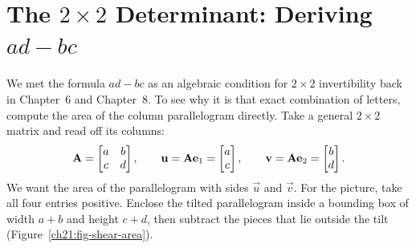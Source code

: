 \section{The $2\times 2$ Determinant: Deriving \texorpdfstring{$ad-bc$}{ad-bc}}
\label{ch21:2x2}

We met the formula $ad-bc$ as an algebraic condition for $2\times 2$ invertibility
back in Chapter~6 and Chapter~8. To see why it is that exact
combination of letters, compute the area of the column parallelogram directly.
Take a general $2\times 2$ matrix and read off its columns:
\[
  \mathbf{A} = \begin{bmatrix} a & b \\ c & d \end{bmatrix},
  \qquad
  \mathbf{u} = \mathbf{A}\mathbf{e}_1 = \begin{bmatrix}a\\c\end{bmatrix},
  \qquad
  \mathbf{v} = \mathbf{A}\mathbf{e}_2 = \begin{bmatrix}b\\d\end{bmatrix}.
\]
We want the area of the parallelogram with sides $\vec{u}$ and $\vec{v}$. For the
picture, take all four entries positive. Enclose the tilted parallelogram inside a
bounding box of width $a+b$ and height $c+d$, then subtract the pieces that lie
outside the tilt (Figure~\ref{ch21:fig-shear-area}).

